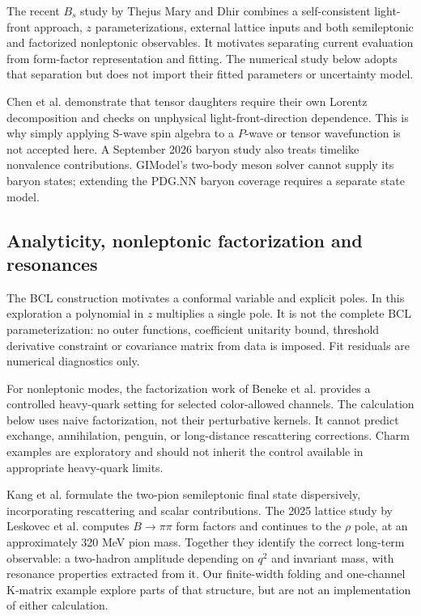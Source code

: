 \documentclass[11pt,a4paper]{article}
\begin{document}
The recent $B_s$ study by Thejus Mary and Dhir \cite{bs2025} combines a self-consistent light-front approach, $z$ parameterizations, external lattice inputs and both semileptonic and factorized nonleptonic observables. It motivates separating current evaluation from form-factor representation and fitting. The numerical study below adopts that separation but does not import their fitted parameters or uncertainty model.

Chen et al. \cite{tensor} demonstrate that tensor daughters require their own Lorentz decomposition and checks on unphysical light-front-direction dependence. This is why simply applying S-wave spin algebra to a $P$-wave or tensor wavefunction is not accepted here. A September 2026 baryon study \cite{baryon2026} also treats timelike nonvalence contributions. GIModel's two-body meson solver cannot supply its baryon states; extending the PDG.NN baryon coverage requires a separate state model.

\subsection{Analyticity, nonleptonic factorization and resonances}
The BCL construction \cite{bcl} motivates a conformal variable and explicit poles. In this exploration a polynomial in $z$ multiplies a single pole. It is not the complete BCL parameterization: no outer functions, coefficient unitarity bound, threshold derivative constraint or covariance matrix from data is imposed. Fit residuals are numerical diagnostics only.

For nonleptonic modes, the factorization work of Beneke et al. \cite{qcdff} provides a controlled heavy-quark setting for selected color-allowed channels. The calculation below uses naive factorization, not their perturbative kernels. It cannot predict exchange, annihilation, penguin, or long-distance rescattering corrections. Charm examples are exploratory and should not inherit the control available in appropriate heavy-quark limits.

Kang et al. \cite{bl4} formulate the two-pion semileptonic final state dispersively, incorporating rescattering and scalar contributions. The 2025 lattice study by Leskovec et al. \cite{latticerho} computes $B\to\pi\pi$ form factors and continues to the $\rho$ pole, at an approximately 320 MeV pion mass. Together they identify the correct long-term observable: a two-hadron amplitude depending on $q^2$ and invariant mass, with resonance properties extracted from it. Our finite-width folding and one-channel K-matrix example explore parts of that structure, but are not an implementation of either calculation.
\end{document}
